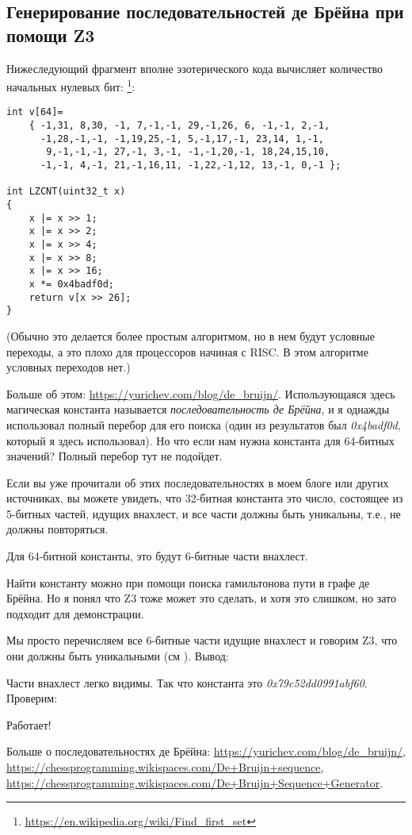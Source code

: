 \subsection{Генерирование последовательностей де Брёйна при помощи Z3}
\label{DeBruijnZ3}

Нижеследующий фрагмент вполне эзотерического кода вычисляет количество начальных нулевых бит:
\footnote{\url{https://en.wikipedia.org/wiki/Find_first_set}}:

\begin{lstlisting}
int v[64]=
	{ -1,31, 8,30, -1, 7,-1,-1, 29,-1,26, 6, -1,-1, 2,-1,
	  -1,28,-1,-1, -1,19,25,-1, 5,-1,17,-1, 23,14, 1,-1,
	   9,-1,-1,-1, 27,-1, 3,-1, -1,-1,20,-1, 18,24,15,10,
	  -1,-1, 4,-1, 21,-1,16,11, -1,22,-1,12, 13,-1, 0,-1 };

int LZCNT(uint32_t x)
{
    x |= x >> 1;
    x |= x >> 2;
    x |= x >> 4;
    x |= x >> 8;
    x |= x >> 16;
    x *= 0x4badf0d;
    return v[x >> 26];
}
\end{lstlisting}

(Обычно это делается более простым алгоритмом, но в нем будут условные переходы,
а это плохо для процессоров начиная с RISC. В этом алгоритме условных переходов нет.)

Больше об этом: \url{https://yurichev.com/blog/de_bruijn/}.
Использующаяся здесь магическая константа называется \textit{последовательность де Брёйна},
и я однажды использовал полный перебор для его поиска (один из результатов был \textit{0x4badf0d},
который я здесь использовал).
Но что если нам нужна константа для 64-битных значений?
Полный перебор тут не подойдет.

Если вы уже прочитали об этих последовательностях в моем блоге или других источниках,
вы можете увидеть, что 32-битная константа это число, состоящее из 5-битных частей, идущих внахлест,
и все части должны быть уникальны, т.е., не должны повторяться.

Для 64-битной константы, это будут 6-битные части внахлест.

Найти константу можно при помощи поиска гамильтонова пути в графе де Брёйна.
Но я понял что Z3 тоже может это сделать, и хотя это слишком, но зато подходит для демонстрации.



Мы просто перечисляем все 6-битные части идущие внахлест и говорим Z3, что они должны быть уникальными (см ).
Вывод:



Части внахлест легко видимы.
Так что константа это \textit{0x79c52dd0991abf60}.
Проверим:



Работает!

Больше о последовательностях де Брёйна:
\url{https://yurichev.com/blog/de_bruijn/},
\url{https://chessprogramming.wikispaces.com/De+Bruijn+sequence},
\url{https://chessprogramming.wikispaces.com/De+Bruijn+Sequence+Generator}.

